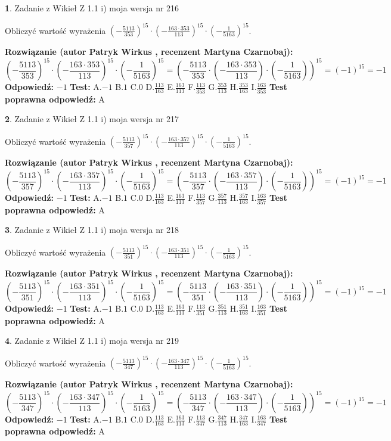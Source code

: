 \documentclass[12pt, a4paper]{article}
\theoremstyle{definition} %
\newtheorem{zad}{}
\newcommand{\zadStart}[1]{\begin{zad}#1\newline}
\newcommand{\zadStop}{\end{zad}}
\newcommand{\rozwStart}[2]{\noindent \textbf{Rozwiązanie (autor #1 , recenzent #2): }\newline}
\newcommand{\rozwStop}{\newline}
\newcommand{\odpStart}{\noindent \textbf{Odpowiedź:}\newline}
\newcommand{\odpStop}{\newline}
\newcommand{\testStart}{\noindent \textbf{Test:}\newline}
\newcommand{\testStop}{\newline}
\newcommand{\kluczStart}{\noindent \textbf{Test poprawna odpowiedź:}\newline}
\newcommand{\kluczStop}{\newline}
\begin{document}
\zadStart{Zadanie z Wikieł Z 1.1 i) moja wersja nr 216}

Obliczyć wartość wyrażenia $(-\frac{5113}{353})^{15} \cdot (-\frac{163 \cdot 353}{113})^{15} \cdot (-\frac{1}{5163})^{15}$.
\zadStop
\rozwStart{Patryk Wirkus}{Martyna Czarnobaj}
$$(-\frac{5113}{353})^{15} \cdot (-\frac{163 \cdot 353}{113})^{15} \cdot (-\frac{1}{5163})^{15} = (-\frac{5113}{353} \cdot (-\frac{163 \cdot 353}{113}) \cdot (-\frac{1}{5163}))^{15} = (-1)^{15} = -1$$
\rozwStop
\odpStart
$-1$
\odpStop
\testStart
A.$-1$ B.$1$ C.$0$ D.$\frac{113}{163}$ E.$\frac{163}{113}$
F.$\frac{113}{353}$ G.$\frac{353}{113}$
H.$\frac{353}{163}$
I.$\frac{163}{353}$
\testStop
\kluczStart
A
\kluczStop



\zadStart{Zadanie z Wikieł Z 1.1 i) moja wersja nr 217}

Obliczyć wartość wyrażenia $(-\frac{5113}{357})^{15} \cdot (-\frac{163 \cdot 357}{113})^{15} \cdot (-\frac{1}{5163})^{15}$.
\zadStop
\rozwStart{Patryk Wirkus}{Martyna Czarnobaj}
$$(-\frac{5113}{357})^{15} \cdot (-\frac{163 \cdot 357}{113})^{15} \cdot (-\frac{1}{5163})^{15} = (-\frac{5113}{357} \cdot (-\frac{163 \cdot 357}{113}) \cdot (-\frac{1}{5163}))^{15} = (-1)^{15} = -1$$
\rozwStop
\odpStart
$-1$
\odpStop
\testStart
A.$-1$ B.$1$ C.$0$ D.$\frac{113}{163}$ E.$\frac{163}{113}$
F.$\frac{113}{357}$ G.$\frac{357}{113}$
H.$\frac{357}{163}$
I.$\frac{163}{357}$
\testStop
\kluczStart
A
\kluczStop



\zadStart{Zadanie z Wikieł Z 1.1 i) moja wersja nr 218}

Obliczyć wartość wyrażenia $(-\frac{5113}{351})^{15} \cdot (-\frac{163 \cdot 351}{113})^{15} \cdot (-\frac{1}{5163})^{15}$.
\zadStop
\rozwStart{Patryk Wirkus}{Martyna Czarnobaj}
$$(-\frac{5113}{351})^{15} \cdot (-\frac{163 \cdot 351}{113})^{15} \cdot (-\frac{1}{5163})^{15} = (-\frac{5113}{351} \cdot (-\frac{163 \cdot 351}{113}) \cdot (-\frac{1}{5163}))^{15} = (-1)^{15} = -1$$
\rozwStop
\odpStart
$-1$
\odpStop
\testStart
A.$-1$ B.$1$ C.$0$ D.$\frac{113}{163}$ E.$\frac{163}{113}$
F.$\frac{113}{351}$ G.$\frac{351}{113}$
H.$\frac{351}{163}$
I.$\frac{163}{351}$
\testStop
\kluczStart
A
\kluczStop



\zadStart{Zadanie z Wikieł Z 1.1 i) moja wersja nr 219}

Obliczyć wartość wyrażenia $(-\frac{5113}{347})^{15} \cdot (-\frac{163 \cdot 347}{113})^{15} \cdot (-\frac{1}{5163})^{15}$.
\zadStop
\rozwStart{Patryk Wirkus}{Martyna Czarnobaj}
$$(-\frac{5113}{347})^{15} \cdot (-\frac{163 \cdot 347}{113})^{15} \cdot (-\frac{1}{5163})^{15} = (-\frac{5113}{347} \cdot (-\frac{163 \cdot 347}{113}) \cdot (-\frac{1}{5163}))^{15} = (-1)^{15} = -1$$
\rozwStop
\odpStart
$-1$
\odpStop
\testStart
A.$-1$ B.$1$ C.$0$ D.$\frac{113}{163}$ E.$\frac{163}{113}$
F.$\frac{113}{347}$ G.$\frac{347}{113}$
H.$\frac{347}{163}$
I.$\frac{163}{347}$
\testStop
\kluczStart
A
\kluczStop
\end{document}
